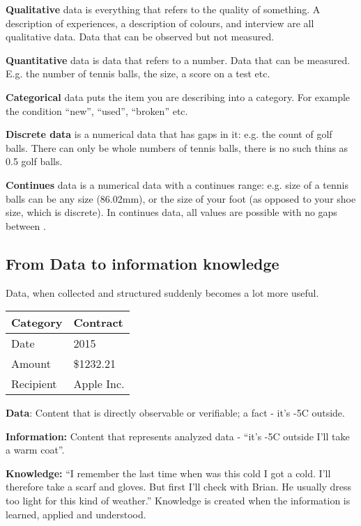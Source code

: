 \documentclass[letterpaper,10pt,oneside]{sphinxmanual}
\begin{document}
\textbf{Qualitative} data is everything that refers to the quality of something.
A description of experiences, a description of colours, and interview are all qualitative data.
Data that can be observed but not measured.

\textbf{Quantitative} data is data that refers to a number. Data that can be measured. E.g. the number of tennis balls, the size, a score on a test etc.

\textbf{Categorical} data puts the item you are describing into a category. For example the condition “new”, “used”, “broken” etc.

\textbf{Discrete data} is a numerical data that has gaps in it: e.g. the count of golf balls. There can only be whole numbers of tennis balls, there is no such thins as 0.5 golf balls.

\textbf{Continues} data is a numerical data with a continues range: e.g. size of a tennis balls can be any size (86.02mm), or the size of your foot (as opposed to your shoe size, which is discrete). In continues data, all values are possible with no gaps between .


\subsection{\textbf{From Data to information knowledge}}
\label{introduction:from-data-to-information-knowledge}
Data, when collected and structured suddenly becomes a lot more useful.

\begin{tabulary}{\linewidth}{|L|L|}
\hline
\textsf{\relax 
Category
} & \textsf{\relax 
Contract
}\\
\hline
Date
 & 
2015
\\
\hline
Amount
 & 
\$1232.21
\\
\hline
Recipient
 & 
Apple Inc.
\\
\hline\end{tabulary}


\textbf{Data}: Content that is directly observable or verifiable; a fact - it’s -5C outside.

\textbf{Information:} Content that represents analyzed data - “it’s -5C outside I’ll take a warm coat''.

\textbf{Knowledge:} “I remember the last time when was this cold I got a cold. I’ll therefore take a scarf and gloves.
But first I’ll check with Brian. He usually dress too light for this kind of weather.”
Knowledge is created when the information is learned, applied and understood.
\end{document}
